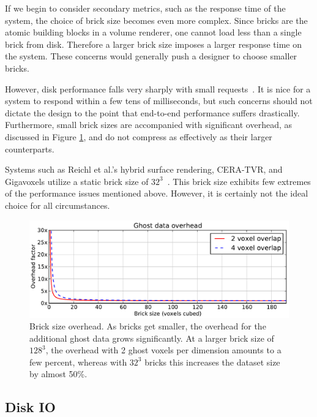 If we begin to consider secondary metrics, such as the response time of
the system, the choice of brick size becomes even more complex.  Since
bricks are the atomic building blocks in a volume renderer, one cannot
load less than a single brick from disk. Therefore a larger brick size
imposes a larger response time on the system.  These concerns would
generally push a designer to choose smaller bricks.

However, disk performance falls very sharply with small
requests~\cite{Fogal:2011:PracticalIO}.  It is nice for a system to
respond within a few tens of milliseconds, but such concerns should not
dictate the design to the point that end-to-end performance suffers
drastically.  Furthermore, small brick sizes are accompanied with
significant
overhead, as discussed in Figure \ref{fig:brick-size}, and do not
compress as effectively as their larger counterparts.

Systems such as Reichl et al.'s hybrid surface rendering, CERA-TVR, and
Gigavoxels utilize a static brick size of
$32^3$~\cite{Reichl:2012:HybridSurface, Engel:2012:CERA,
Crassin:2009:Gigavoxels}.  This brick size exhibits few extremes of the
performance issues mentioned above. However, it is certainly not the
ideal choice for all circumstances.

\begin{figure}
  \centering
  \includegraphics[width=0.99\linewidth]{images/rg/BS-overhead.pdf}
  \caption{Brick size overhead.  As bricks get smaller, the overhead
  for the additional ghost data grows significantly.  At a larger brick
  size of $128^3$, the overhead with 2 ghost voxels per dimension
  amounts to a few percent, whereas with $32^3$ bricks this increases
  the dataset size by almost 50\%.}
  \label{fig:brick-size}
\end{figure}

\subsection{Disk IO}

